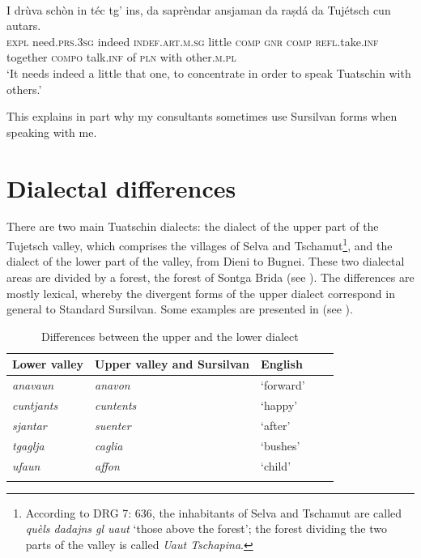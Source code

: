 \ea
\label{}
\\
\gll I drùva schòn in téc tg' ins, da saprèndar ansjaman da raṣdá da Tujétsch cun autars.\\
\textsc{expl} need.\textsc{prs.3sg} indeed \textsc{indef.art.m.sg} little \textsc{comp} \textsc{gnr} \textsc{comp} \textsc{refl}.take.\textsc{inf} together \textsc{compo} talk.\textsc{inf} of \textsc{pln} with other.\textsc{m.pl}\\
\glt `It needs indeed a little that one, to concentrate in order to speak Tuatschin with others.'
\z

This explains in part why my consultants sometimes use Sursilvan forms when speaking with me.

\section{Dialectal differences}
There are two main Tuatschin dialects: the dialect of the upper part of the Tujetsch valley, which comprises the villages of Selva and Tschamut\footnote{According to DRG 7: 636, the inhabitants of Selva and Tschamut are called \textit{quèls dadajns gl uaut} `those above the forest'; the forest dividing the two parts of the valley is called \textit{Uaut Tschapina}.}, and the dialect of the lower part of the valley, from Dieni to Bugnei. These two dialectal areas are divided by a forest, the forest of Sontga Brida (see \citet[3]{Caduff1952}). The differences are mostly lexical, whereby the divergent forms of the upper dialect correspond in general to Standard Sursilvan. Some examples are presented in  (see \citet[97]{VicHendry2010}).

\begin{table}
	\caption{Differences between the upper and the lower dialect}
	\label{difdial}
	\begin{tabular}{lllll}
		\lsptoprule
		Lower valley &  Upper valley and Sursilvan & English\\
		\midrule
		\textit{anavaun} & \textit{anavon} & `forward' \\
		\textit{cuntjants} & \textit{cuntents} & `happy' \\
		\textit{sjantar} & \textit{suenter} & `after'\\
		\textit{tgaglja} & \textit{caglia} & `bushes'\\
		\textit{ufaun} & \textit{affon} & `child' \\
		\lspbottomrule
	\end{tabular}
\end{table}

